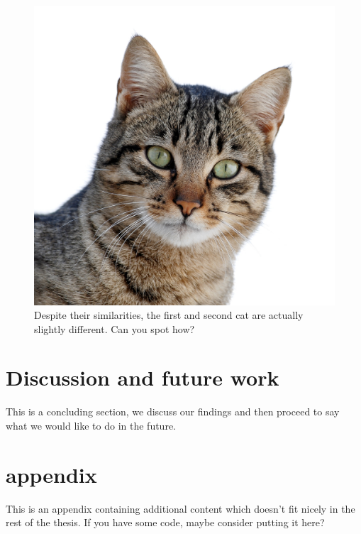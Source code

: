 \documentclass[12pt]{report}
\begin{document}
\begin{figure}[htbp]
\begin{center}
\includegraphics[height=.08\textheight]{cat.jpg}
\caption[some cats]{Despite their similarities, the first and second cat are actually slightly different. Can you spot how?}
\end{center}
\label{cats}
\end{figure}


\chapter{Discussion and future work}
This is a concluding section, we discuss our findings and then proceed to say what we would like to do in the future.





\appendix
\chapter{appendix}
\label{sec:appendix_code}

This is an appendix containing additional content which doesn't fit nicely in the rest of the thesis. If you have some code, maybe consider putting it here?
\end{document}
